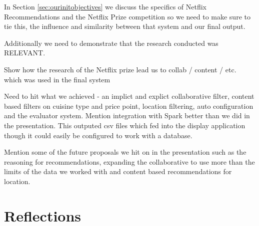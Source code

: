 \documentclass{l3proj}
\begin{document}
In Section \ref{sec:ourinitobjectives} we discuss the specifics of Netflix Recommendations and the Netflix Prize competition so we need to make sure to tie this, the influence and similarity between that system and our final output. 

Additionally we need to demonstrate that the research conducted was RELEVANT.

Show how the research of the Netflix prize lead us to collab / content / etc. which was used in the final system

Need to hit what we achieved - an implict and explict collaborative filter, content based filters on cuisine type and price point, location filtering, auto configuration and the evaluator system. Mention integration with Spark better than we did in the presentation. This outputed csv files which fed into the display application though it could easily be configured to work with a database. 

Mention some of the future proposals we hit on in the presentation such as the reasoning for recommendations, expanding the collaborative to use more than the limits of the data we worked with and content based recommendations for location.

\newpage

\section{Reflections}
\label{sec:reflections}




\end{document}
